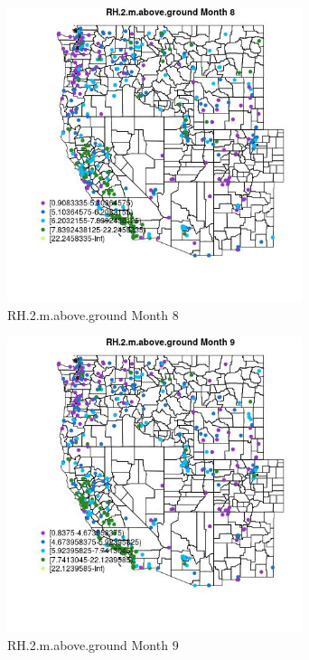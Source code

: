 \begin{figure} 
\centering  
\includegraphics[width=0.77\textwidth]{Code_Outputs/ML_input_report_ML_input_PM25_Step5_part_d_de_duplicated_aves_ML_input_MapObsMo8RH2maboveground.jpg} 
\caption{\label{fig:ML_input_report_ML_input_PM25_Step5_part_d_de_duplicated_aves_ML_inputMapObsMo8RH2maboveground}RH.2.m.above.ground Month 8} 
\end{figure} 
 

\begin{figure} 
\centering  
\includegraphics[width=0.77\textwidth]{Code_Outputs/ML_input_report_ML_input_PM25_Step5_part_d_de_duplicated_aves_ML_input_MapObsMo9RH2maboveground.jpg} 
\caption{\label{fig:ML_input_report_ML_input_PM25_Step5_part_d_de_duplicated_aves_ML_inputMapObsMo9RH2maboveground}RH.2.m.above.ground Month 9} 
\end{figure} 
 

